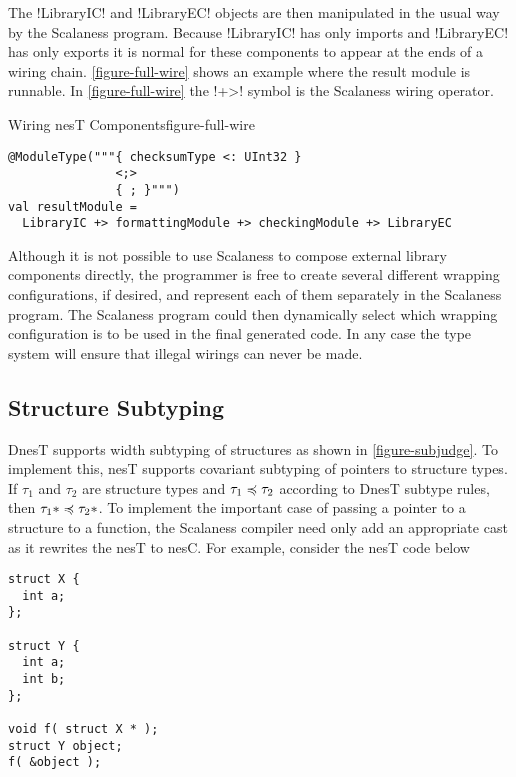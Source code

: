 The !LibraryIC! and !LibraryEC! objects are then manipulated in the usual way by the Scalaness
program. Because !LibraryIC! has only imports and !LibraryEC! has only exports it is normal for
these components to appear at the ends of a wiring chain. \autoref{figure-full-wire} shows an
example where the result module is runnable. In \autoref{figure-full-wire} the !+>! symbol is
the Scalaness wiring operator.

\singlespace
\begin{fpfig}[tbhp]{Wiring nesT Components}{figure-full-wire}
{
\begin{lstlisting}[language=scalaness]
@ModuleType("""{ checksumType <: UInt32 }
               <;>
               { ; }""")
val resultModule =
  LibraryIC +> formattingModule +> checkingModule +> LibraryEC
\end{lstlisting}
}
\end{fpfig}
\primaryspacing

Although it is not possible to use Scalaness to compose external library components directly,
the programmer is free to create several different wrapping configurations, if desired, and
represent each of them separately in the Scalaness program. The Scalaness program could then
dynamically select which wrapping configuration is to be used in the final generated code. In
any case the type system will ensure that illegal wirings can never be made.

\subsection{Structure Subtyping}
\label{section-structure-subtyping}


DnesT supports width subtyping of structures as shown in \autoref{figure-subjudge}. To implement
this, nesT supports covariant subtyping of pointers to structure types. If $\tau_1$ and $\tau_2$
are structure types and $\tau_1 \preccurlyeq \tau_2$ according to DnesT subtype rules, then $\tau_1*
\preccurlyeq \tau_2*$. To implement the important case of passing a pointer to a structure to a
function, the Scalaness compiler need only add an appropriate cast as it rewrites the nesT to
nesC. For example, consider the nesT code below

\singlespace
\vspace{1.0ex}
\begin{lstlisting}[language=nesC]
struct X {
  int a;
};

struct Y {
  int a;
  int b;
};

void f( struct X * );
struct Y object;
f( &object );
\end{lstlisting}
\vspace{1.0ex}
\primaryspacing

